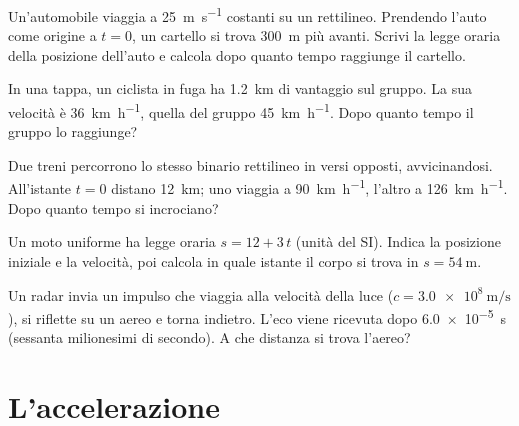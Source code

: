 \begin{esercizio}
Un'automobile viaggia a \SI{25}{\metre\per\second} costanti su un rettilineo. Prendendo l'auto come origine a $t = 0$, un cartello si trova \SI{300}{\metre} più avanti. Scrivi la legge oraria della posizione dell'auto e calcola dopo quanto tempo raggiunge il cartello.\\
\end{esercizio}

\begin{esercizio}
In una tappa, un ciclista in fuga ha \SI{1,2}{\kilo\metre} di vantaggio sul gruppo. La sua velocità è \SI{36}{\kilo\metre\per\hour}, quella del gruppo \SI{45}{\kilo\metre\per\hour}. Dopo quanto tempo il gruppo lo raggiunge?\\
\end{esercizio}

\begin{esercizio}
Due treni percorrono lo stesso binario rettilineo in versi opposti, avvicinandosi. All'istante $t = 0$ distano \SI{12}{\kilo\metre}; uno viaggia a \SI{90}{\kilo\metre\per\hour}, l'altro a \SI{126}{\kilo\metre\per\hour}. Dopo quanto tempo si incrociano?\\
\end{esercizio}

\begin{esercizio}
Un moto uniforme ha legge oraria $s = 12 + 3\,t$ (unità del SI). Indica la posizione iniziale e la velocità, poi calcola in quale istante il corpo si trova in $s = \SI{54}{\metre}$.\\
\end{esercizio}

\begin{esercizio}
Un radar invia un impulso che viaggia alla velocità della luce ($c = \SI{3,0e8}{\metre\per\second}$), si riflette su un aereo e torna indietro. L'eco viene ricevuta dopo \SI{6,0e-5}{\second} (sessanta milionesimi di secondo). A che distanza si trova l'aereo?\\
\end{esercizio}

\section{L'accelerazione}


